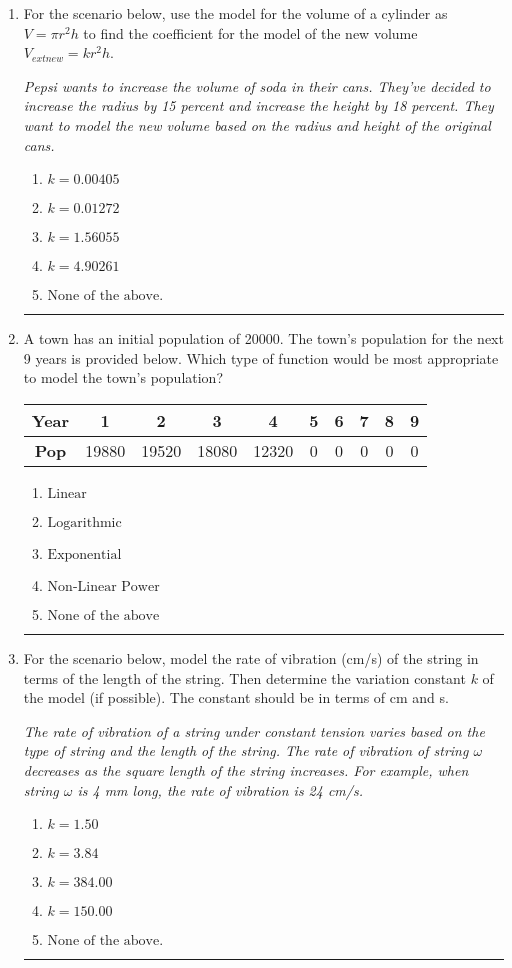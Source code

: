 \documentclass[14pt]{extbook}
\newcommand{\litem}[1]{\item#1\hspace*{-1cm}\rule{\textwidth}{0.4pt}}
\begin{document}
\begin{enumerate}
{\begin{enumerate}[label=\Alph*.]
\end{enumerate} }
\litem{
For the scenario below, use the model for the volume of a cylinder as $V = \pi r^2 h$ to find the coefficient for the model of the new volume $V_{	ext{new}} = k r^2 h$.
\begin{center}
    \textit{ Pepsi wants to increase the volume of soda in their cans. They've decided to increase the radius by 15 percent and increase the height by 18 percent. They want to model the new volume based on the radius and height of the original cans. }
\end{center}
\begin{enumerate}[label=\Alph*.]
\item \( k = 0.00405 \)
\item \( k = 0.01272 \)
\item \( k = 1.56055 \)
\item \( k = 4.90261 \)
\item \( \text{None of the above.} \)

\end{enumerate} }
\litem{
A town has an initial population of 20000. The town's population for the next 9 years is provided below. Which type of function would be most appropriate to model the town's population?

\begin{tabular}{c|c|c|c|c|c|c|c|c|c}
\textbf{Year} &1 &2 &3 &4 &5 &6 &7 &8 &9\tabularnewline \hline
\textbf{Pop} &19880 &19520 &18080 &12320 &0 &0 &0 &0 &0\end{tabular}\begin{enumerate}[label=\Alph*.]
\item \( \text{Linear} \)
\item \( \text{Logarithmic} \)
\item \( \text{Exponential} \)
\item \( \text{Non-Linear Power} \)
\item \( \text{None of the above} \)

\end{enumerate} }
\litem{
For the scenario below, model the rate of vibration (cm/s) of the string in terms of the length of the string. Then determine the variation constant $k$ of the model (if possible). The constant should be in terms of cm and s.
\begin{center}
    \textit{ The rate of vibration of a string under constant tension varies based on the type of string and the length of the string. The rate of vibration of string $\omega$ decreases as the square length of the string increases. For example, when string $\omega$ is 4 mm long, the rate of vibration is 24 cm/s. }
\end{center}
\begin{enumerate}[label=\Alph*.]
\item \( k = 1.50 \)
\item \( k = 3.84 \)
\item \( k = 384.00 \)
\item \( k = 150.00 \)
\item \( \text{None of the above.} \)


\end{enumerate}}
\end{enumerate}
\end{document}
